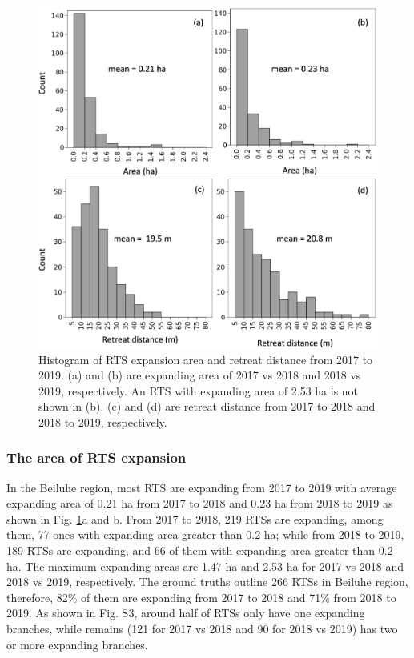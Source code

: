 \documentclass[authoryear,preprint,review,12pt]{elsarticle}
\begin{document}
\begin{figure} 
	\centering
	\includegraphics[width=14cm]{figs/rts_change_area_dis_manu_trim.jpg}
	\caption{Histogram of RTS expansion area and retreat distance from 2017 to 2019. (a) and (b) are expanding area  of 2017 vs 2018 and 2018 vs 2019, respectively. An RTS with expanding area of 2.53 ha is not shown in  (b). (c) and (d) are retreat distance from 2017 to 2018 and 2018 to 2019, respectively.}
	\label{fig_rts_change_area_reDis}
\end{figure}

\subsubsection{The area of RTS expansion}
\label{sec_rts_change_area}


In the Beiluhe region, most RTS are expanding from 2017 to 2019 with average expanding area of 0.21 ha from 2017 to 2018 and 0.23 ha from 2018 to 2019 as shown in Fig. \ref{fig_rts_change_area_reDis}a and b.
From 2017 to 2018, 219 RTSs are expanding, among them, 77 ones with expanding area greater than 0.2 ha; while from 2018 to 2019, 189 RTSs are expanding, and 66 of them with expanding area greater than 0.2 ha.
The maximum expanding areas are 1.47 ha and 2.53 ha for 2017 vs 2018 and 2018 vs 2019, respectively. 
The ground truths outline 266 RTSs in Beiluhe region, therefore, 82\% of them are expanding from 2017 to 2018 and 71\% from 2018 to 2019. 
As shown in Fig. S3, around half of RTSs only have one expanding branches, while remains (121 for 2017 vs 2018 and 90 for 2018 vs 2019)  has two or more expanding branches. 
\end{document}
